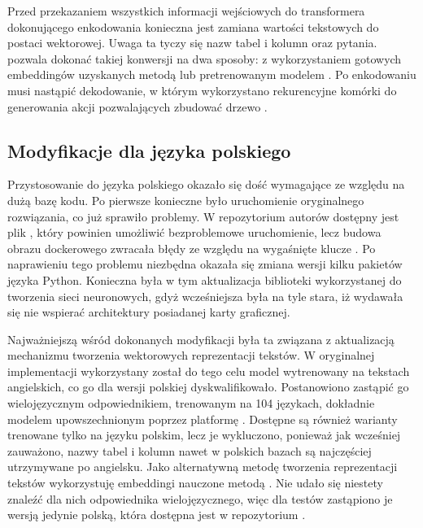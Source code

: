Przed przekazaniem wszystkich informacji wejściowych do transformera dokonującego enkodowania konieczna jest zamiana wartości tekstowych do postaci wektorowej. Uwaga ta tyczy się nazw tabel i kolumn oraz pytania.  pozwala dokonać takiej konwersji na dwa sposoby: z wykorzystaniem gotowych embeddingów uzyskanych metodą  lub pretrenowanym modelem . Po enkodowaniu musi nastąpić dekodowanie, w którym wykorzystano rekurencyjne komórki  do generowania akcji pozwalających zbudować drzewo .

\subsection{Modyfikacje dla języka polskiego}
Przystosowanie  do języka polskiego okazało się dość wymagające ze względu na dużą bazę kodu. Po pierwsze konieczne było uruchomienie oryginalnego rozwiązania, co już sprawiło problemy. W repozytorium autorów dostępny jest plik , który powinien umożliwić bezproblemowe uruchomienie, lecz budowa obrazu dockerowego zwracała błędy ze względu na wygaśnięte klucze . Po naprawieniu tego problemu niezbędna okazała się zmiana wersji kilku pakietów języka Python. Konieczna była w tym aktualizacja biblioteki  wykorzystanej do tworzenia sieci neuronowych, gdyż wcześniejsza była na tyle stara, iż wydawała się nie wspierać architektury posiadanej karty graficznej.

Najważniejszą wśród dokonanych modyfikacji była ta związana z aktualizacją mechanizmu tworzenia wektorowych reprezentacji tekstów. W oryginalnej implementacji wykorzystany został do tego celu model  wytrenowany na tekstach angielskich, co go dla wersji polskiej dyskwalifikowało. Postanowiono zastąpić go wielojęzycznym odpowiednikiem, trenowanym na 104 językach, dokładnie modelem  upowszechnionym poprzez platformę . Dostępne są również warianty trenowane tylko na języku polskim, lecz je wykluczono, ponieważ jak wcześniej zauważono, nazwy tabel i kolumn nawet w polskich bazach są najczęściej utrzymywane po angielsku. Jako alternatywną metodę tworzenia reprezentacji tekstów  wykorzystuję embeddingi nauczone metodą . Nie udało się niestety znaleźć dla nich odpowiednika wielojęzycznego, więc dla testów zastąpiono je wersją jedynie polską, która dostępna jest w repozytorium . 

